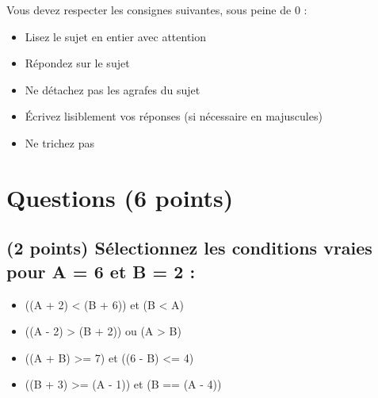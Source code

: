 \documentclass[11pt,a4paper]{article}
\begin{document}
\MakeExamTitle                   %



Vous devez respecter les consignes suivantes, sous peine de 0 :

\begin{itemize}
\item Lisez le sujet en entier avec attention
\item Répondez sur le sujet
\item Ne détachez pas les agrafes du sujet
\item \'Ecrivez lisiblement vos réponses (si nécessaire en majuscules)
\item Ne trichez pas
\end{itemize}



\section{Questions (6 points)}

\subsection{(2 points) Sélectionnez les conditions vraies pour A = 6 et B = 2 : }


\begin{table}[!ht]
  \centering
  \begin{minipage}{0.65\textwidth}
    \centering

\begin{itemize}
  \item[\CaseCoche] ((A + 2) < (B + 6)) et (B < A)   %
  \item[\checkmark] ((A - 2) > (B + 2)) ou (A > B)   %
  \item[\checkmark] ((A + B) >= 7) et ((6 - B) <= 4) %
  \item[\checkmark] ((B + 3) >= (A - 1)) et (B == (A - 4)) %
\end{itemize}


  \end{minipage}
  \hfillx
  \begin{minipage}{0.35\textwidth}
    \centering

  \end{minipage}
\end{table}
\end{document}
